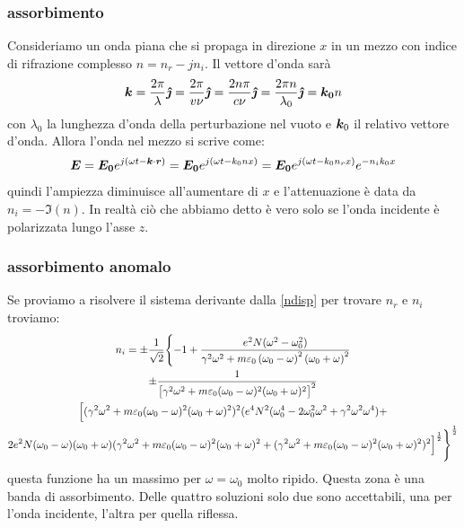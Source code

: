 \subsubsection{assorbimento}
Consideriamo un onda piana che si propaga in direzione $x$ in un mezzo con indice di rifrazione complesso $n=n_r-jn_i$. Il vettore d'onda sarà
\begin{equation}
  \boldsymbol{k}=\frac{2\pi}{\lambda}\boldsymbol{\hat {\jmath}}=\frac{2\pi}{v\nu}\boldsymbol{\hat {\jmath}}=\frac{2n\pi}{c\nu}\boldsymbol{\hat {\jmath}}=\frac{2\pi n}{\lambda_0}\boldsymbol{\hat {\jmath}}=\boldsymbol{k_0}n
\end{equation}
con $\lambda_0$ la lunghezza d'onda della perturbazione nel vuoto e $\boldsymbol{k}_0$ il relativo vettore d'onda. Allora l'onda nel mezzo si scrive come:
\begin{equation}
  \boldsymbol{E}=\boldsymbol{E_0}e^{j(\omega t-\boldsymbol{k}\cdot \boldsymbol{r})}=\boldsymbol{E_0}e^{j(\omega t-k_0 n x)}=\boldsymbol{E_0}e^{j(\omega t-k_0 n_r x)}e^{-n_ik_0 x}
\end{equation}
quindi l'ampiezza diminuisce all'aumentare di $x$ e l'attenuazione è data da $n_i=-\Im(n)$. In realtà ciò che abbiamo detto è vero solo se l'onda incidente è polarizzata lungo l'asse $z$.
\subsubsection{assorbimento anomalo}
Se proviamo a risolvere il sistema derivante dalla \eqref{ndisp} per trovare $n_r$ e $n_i$ troviamo:
\begin{multline}
  n_i=\pm\frac{1}{\sqrt{2}}\Biggl\{-1+\frac{e^2N(\omega^2-\omega_0^2)}{\gamma^2\omega^2+m\varepsilon_0\left(\omega_0-\omega\right)^2\left(\omega_0+\omega\right)^2}\\
  \pm\frac{1} {\bigl[\gamma^2\omega^2+m\varepsilon_0(\omega_0-\omega)^2(\omega_0+\omega)^2\bigr]^2}\\
  \Bigl[(\gamma^2\omega^2+m\varepsilon_0(\omega_0-\omega)^2(\omega_0+\omega)^2)^2(e^4N^2(\omega_0^4-2\omega_0^2\omega^2+\gamma^2\omega^2\omega^4)+\\
    2e^2 N(\omega_0-\omega)(\omega_0+\omega)(\gamma^2\omega^2+m\varepsilon_0(\omega_0-\omega)^2(\omega_0+\omega)^2+(\gamma^2\omega^2+m\varepsilon_0(\omega_0-\omega)^2(\omega_0+\omega)^2)^2\Bigr]^{\frac{1}{2}}\Biggr\}^{\frac{1}{2}}
\end{multline}
questa funzione ha un massimo per $\omega=\omega_0$ molto ripido. Questa zona è una banda di assorbimento. Delle quattro soluzioni solo due sono accettabili, una per l'onda incidente, l'altra per quella riflessa.
